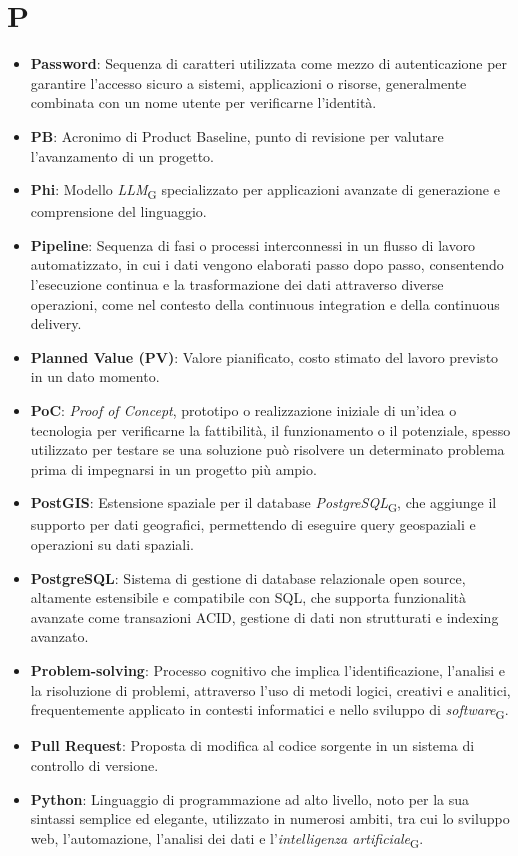 \section{P}
\begin{itemize}
    \item \textbf{Password}: Sequenza di caratteri utilizzata come mezzo di autenticazione per garantire l'accesso sicuro a sistemi, applicazioni o risorse, generalmente combinata con un nome utente per verificarne l'identità.
    \item \textbf{PB}: Acronimo di Product Baseline, punto di revisione per valutare l'avanzamento di un progetto.
    \item \textbf{Phi}: Modello \textit{LLM}\textsubscript{G} specializzato per applicazioni avanzate di generazione e comprensione del linguaggio.
    \item \textbf{Pipeline}: Sequenza di fasi o processi interconnessi in un flusso di lavoro automatizzato, in cui i dati vengono elaborati passo dopo passo, consentendo l'esecuzione continua e la trasformazione dei dati attraverso diverse operazioni, come nel contesto della continuous integration e della continuous delivery.
    \item \textbf{Planned Value (PV)}: Valore pianificato, costo stimato del lavoro previsto in un dato momento.
    \item \textbf{PoC}: \textit{Proof of Concept}, prototipo o realizzazione iniziale di un'idea o tecnologia per verificarne la fattibilità, il funzionamento o il potenziale, spesso utilizzato per testare se una soluzione può risolvere un determinato problema prima di impegnarsi in un progetto più ampio.
    \item \textbf{PostGIS}: Estensione spaziale per il database \textit{PostgreSQL}\textsubscript{G}, che aggiunge il supporto per dati geografici, permettendo di eseguire query geospaziali e operazioni su dati spaziali.
    \item \textbf{PostgreSQL}: Sistema di gestione di database relazionale open source, altamente estensibile e compatibile con SQL, che supporta funzionalità avanzate come transazioni ACID, gestione di dati non strutturati e indexing avanzato.
    \item \textbf{Problem-solving}: Processo cognitivo che implica l'identificazione, l'analisi e la risoluzione di problemi, attraverso l'uso di metodi logici, creativi e analitici, frequentemente applicato in contesti informatici e nello sviluppo di \textit{software}\textsubscript{G}.
    \item \textbf{Pull Request}: Proposta di modifica al codice sorgente in un sistema di controllo di versione.
    \item \textbf{Python}: Linguaggio di programmazione ad alto livello, noto per la sua sintassi semplice ed elegante, utilizzato in numerosi ambiti, tra cui lo sviluppo web, l'automazione, l'analisi dei dati e l'\textit{intelligenza artificiale}\textsubscript{G}.
\end{itemize}

